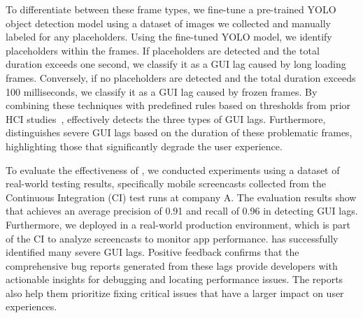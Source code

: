 To differentiate between these frame types, we fine-tune a pre-trained YOLO~\cite{yolov} object detection model using a dataset of images we collected and manually labeled for any placeholders. Using the fine-tuned YOLO model, we identify placeholders within the frames. If placeholders are detected and the total duration exceeds one second, we classify it as a GUI lag caused by long loading frames. Conversely, if no placeholders are detected and the total duration exceeds 100 milliseconds, we classify it as a GUI lag caused by frozen frames. 
By combining these techniques with predefined rules based on thresholds from prior HCI studies~\cite{1968_AFIPS_Response_time_in_man_computer, 1994_Usability_Engineering, zippy_Android_apps, 2015_MOBILESoft_performance_parameters}, \tool effectively detects the three types of GUI lags. Furthermore, \tool distinguishes severe GUI lags based on the duration of these problematic frames, highlighting those that significantly degrade the user experience.

To evaluate the effectiveness of \tool, we conducted experiments using a dataset of real-world testing results, specifically mobile screencasts collected from the Continuous Integration (CI) test runs at company A. 
The evaluation results show that \tool achieves an average precision of 0.91 and recall of 0.96 in detecting GUI lags. 
Furthermore, we deployed \tool in a real-world production environment, which is part of the CI to analyze screencasts to monitor app performance. \tool has successfully identified many severe GUI lags. Positive feedback confirms that the comprehensive bug reports generated from these lags provide developers with actionable insights for debugging and locating performance issues. The reports also help them prioritize fixing critical issues that have a larger impact on user experiences. %

